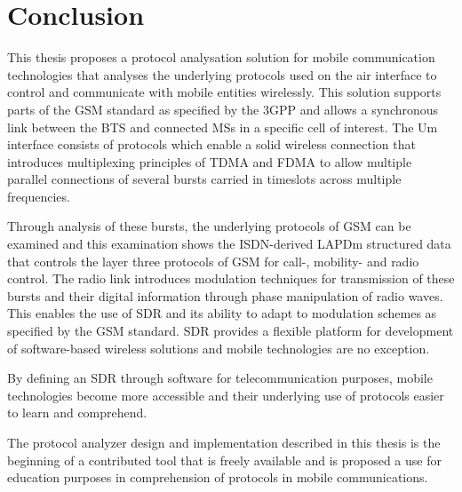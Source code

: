 \chapter{Conclusion}
This thesis proposes a protocol analysation solution for mobile
communication technologies that analyses the underlying protocols used
on the air interface to control and communicate with mobile entities
wirelessly. This solution supports parts of the \gls{GSM} standard as
specified by the \gls{3GPP} and allows a synchronous link between the
\gls{BTS} and connected \glspl{MS} in a specific cell of interest. The
Um interface consists of protocols which enable a solid wireless
connection that introduces multiplexing principles of \gls{TDMA} and
\gls{FDMA} to allow multiple parallel connections of several bursts
carried in timeslots across multiple frequencies.

Through analysis of these bursts, the underlying protocols of
\gls{GSM} can be examined and this examination shows the
\gls{ISDN}-derived \gls{LAPDm} structured data that controls the layer
three protocols of \gls{GSM} for call-, mobility- and radio
control. The radio link introduces modulation techniques for
transmission of these bursts and their digital information through
phase manipulation of radio waves. This enables the use of \gls{SDR}
and its ability to adapt to modulation schemes as specified by the
\gls{GSM} standard. \gls{SDR} provides a flexible platform for
development of software-based wireless solutions and mobile
technologies are no exception.

By defining an \gls{SDR} through software for telecommunication
purposes, mobile technologies become more accessible and their
underlying use of protocols easier to learn and comprehend.

The protocol analyzer design and implementation described in this
thesis is the beginning of a contributed tool that is freely available
and is proposed a use for education purposes in comprehension of
protocols in mobile communications.
